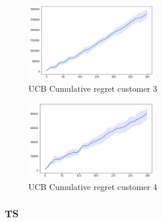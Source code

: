 \begin{multicols}{2}
    \begin{figure}[H]
        \begin{center}
        \includegraphics[width=0.5\textwidth]{img/ucb7_3cum_reg.png}
        \caption{UCB Cumulative regret customer 3}
        \label{fig:cum_reg73}
        \end{center}
    \end{figure}
    \columnbreak
    \begin{figure}[H]
        \begin{center}
        \includegraphics[width=0.5\textwidth]{img/ucb7_4cum_reg.png}
        \caption{UCB Cumulative regret customer 4}
        \label{fig:cum_reg74}
        \end{center}
    \end{figure}
\end{multicols}

\subsubsection{TS}
